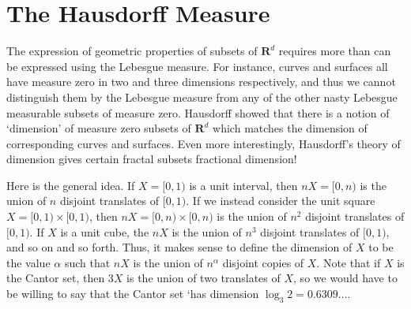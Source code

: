 \chapter{The Hausdorff Measure}

The expression of geometric properties of subsets of $\mathbf{R}^d$ requires more than can be expressed using the Lebesgue measure. For instance, curves and surfaces all have measure zero in two and three dimensions respectively, and thus we cannot distinguish them by the Lebesgue measure from any of the other nasty Lebesgue measurable subsets of measure zero. Hausdorff showed that there is a notion of `dimension' of measure zero subsets of $\mathbf{R}^d$ which matches the dimension of corresponding curves and surfaces. Even more interestingly, Hausdorff's theory of dimension gives certain fractal subsets fractional dimension!

Here is the general idea. If $X = [0,1)$ is a unit interval, then $nX = [0,n)$ is the union of $n$ disjoint translates of $[0,1)$. If we instead consider the unit square $X = [0,1) \times [0,1)$, then $nX = [0,n) \times [0,n)$ is the union of $n^2$ disjoint translates of $[0,1)$. If $X$ is a unit cube, the $nX$ is the union of $n^3$ disjoint translates of $[0,1)$, and so on and so forth. Thus, it makes sense to define the dimension of $X$ to be the value $\alpha$ such that $nX$ is the union of $n^\alpha$ disjoint copies of $X$. Note that if $X$ is the Cantor set, then $3X$ is the union of two translates of $X$, so we would have to be willing to say that the Cantor set `has dimension $\log_3 2 = 0.6309\dots$.


